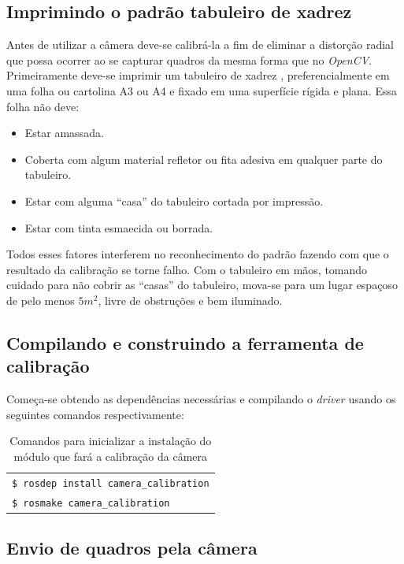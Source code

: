 \subsection{Imprimindo o padrão tabuleiro de xadrez}

Antes de utilizar a câmera deve-se calibrá-la a fim de eliminar a distorção radial que possa ocorrer ao se capturar quadros da mesma forma que no \textit{OpenCV}.
Primeiramente deve-se imprimir um tabuleiro de xadrez \cite{Setup-CalibrateMonocularCamera}, preferencialmente em uma folha ou cartolina A3 ou A4 e fixado em uma superfície rígida e plana. Essa folha não deve: 

\begin{itemize}
	\item{Estar amassada.}
	\item{Coberta com algum material refletor ou fita adesiva em qualquer parte do tabuleiro.}
	\item{Estar com alguma “casa” do tabuleiro cortada por impressão.}
	\item{Estar com tinta esmaecida ou borrada.}
\end{itemize}	

Todos esses fatores interferem no reconhecimento do padrão fazendo com que o resultado da calibração se torne falho. Com o tabuleiro em mãos, tomando cuidado para não cobrir as “casas” do tabuleiro, mova-se para um lugar espaçoso de pelo menos $5m^2$, livre de obstruções e bem iluminado.

\subsection{Compilando e construindo a ferramenta de calibração}

Começa-se obtendo as dependências necessárias e compilando o \textit{driver} usando os seguintes comandos respectivamente:

\begin{table}[H]\label{tb:1}
\begin{tabular}{| p{\textwidth}|}
\hline
\texttt{\$ rosdep install camera\_calibration} \\
\texttt{\$ rosmake camera\_calibration} \\ \hline
\end{tabular}
\caption{Comandos para inicializar a instalação do módulo que fará a calibração da câmera}
\end{table}


\subsection{Envio de quadros pela câmera}

